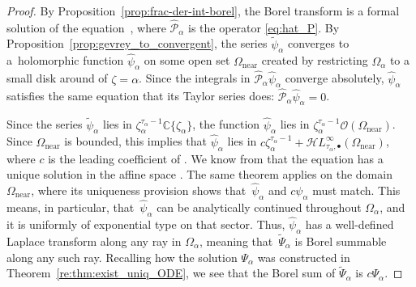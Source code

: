\documentclass[pdftex]{sigma}
\newcommand{\singexp}[2]{\mathcal{H}L^\infty_{#1, #2}}
\newcommand{\singexpalg}[1]{\singexp{#1}{\bullet}}
\newcommand{\C}{\mathbb{C}}
\newcommand{\series}[1]{\tilde{#1}}
\newcommand{\borel}{\mathcal{B}}
\numberwithin{equation}{section}
\begin{document}
\begin{proof}
By Proposition~\ref{prop:frac-der-int-borel}, the Borel transform \smash{$\series{\psi}_\alpha = \borel_\zeta \series{\Psi}_\alpha$} is a formal solution of the equation~\smash{$\hat{\mathcal{P}}_\alpha \series{\psi}_\alpha = 0$}, where $\hat{\mathcal{P}}_\alpha$ is the operator \eqref{eq:hat_P}. By Proposition~\ref{prop:gevrey_to_convergent}, the series $\series{\psi}_\alpha$ converges to a~holomorphic function $\hat{\psi}_\alpha$ on some open set $\Omega_\text{near}$ created by restricting $\Omega_\alpha$ to a small disk around of $\zeta = \alpha$. Since the integrals in $\hat{\mathcal{P}}_\alpha \hat{\psi}_\alpha$ converge absolutely, $\hat{\psi}_\alpha$ satisfies the same equation that its Taylor series does: $\hat{\mathcal{P}}_\alpha \hat{\psi}_\alpha = 0$.

Since the series $\series{\psi}_\alpha$ lies in $\zeta_\alpha^{\tau_\alpha-1} \C\{\zeta_\alpha\}$, the function $\hat{\psi}_\alpha$ lies in $\zeta_\alpha^{\tau_\alpha-1} \mathcal{O}(\Omega_\text{near})$. Since $\Omega_\text{near}$ is bounded, this implies that $\hat{\psi}_\alpha$ lies in $c \zeta_\alpha^{\tau_\alpha-1} + \singexpalg{\tau_\alpha}(\Omega_\text{near})$, where $c$ is the leading coefficient of \smash{$\series{\psi}_\alpha$}. We know from \cite[Theorem~4.6]{reg-sing-volterra} that the equation  has a unique solution in the affine space \smash{$\zeta_\alpha^{\tau_\alpha-1} + \singexpalg{\tau_\alpha}(\Omega_\alpha)$}. The same theorem applies on the domain $\Omega_\text{near}$, where its uniqueness provision shows that~$\hat{\psi}_\alpha$ and $c\psi_\alpha$ must match. This means, in particular, that~$\hat{\psi}_\alpha$ can be analytically continued throughout $\Omega_\alpha$, and it is uniformly of exponential type on that sector. Thus, $\hat{\psi}_\alpha$ has a well-defined Laplace transform along any ray  in $\Omega_\alpha$, meaning that~$\series{\Psi}_\alpha$ is Borel summable along any such ray. Recalling how the solution $\Psi_\alpha$ was constructed in Theorem~\ref{re:thm:exist_uniq_ODE}, we see that the Borel sum of $\series{\Psi}_\alpha$ is $c\Psi_\alpha$.
\end{proof}
\end{document}
